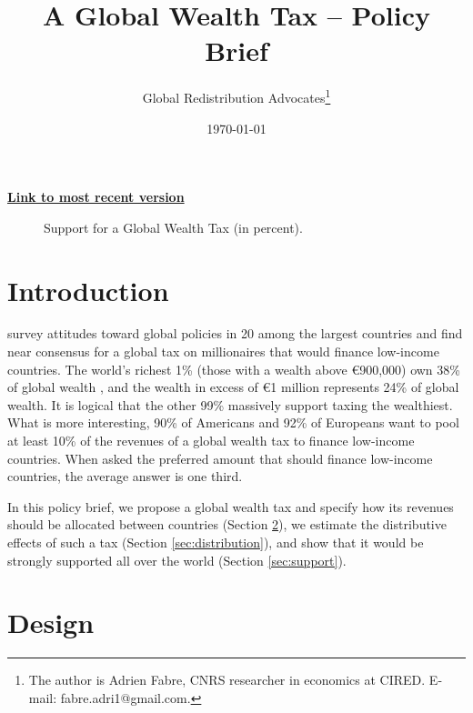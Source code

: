 \documentclass[12pt,english]{article}
\title{A Global Wealth Tax -- Policy Brief
}
\author{Global Redistribution Advocates\footnote{The author is Adrien Fabre, CNRS researcher in economics at CIRED. E-mail: fabre.adri1@gmail.com.}}
\date{\today}
\begin{document}
\maketitle

\begin{center}
{\textbf{\href{https://github.com/bixiou/global_tax_attitudes/raw/main/paper/policy_brief_tax.pdf}{Link to most recent version}}}
\end{center}

\begin{figure}[h!]
  \caption{Support for a Global Wealth Tax (in percent).}\label{fig:support}
\end{figure}

\section{Introduction}\label{sec:intro}

\citet{fabre_international_2023} survey attitudes toward global policies in 20 among the largest countries and find near consensus for a global tax on millionaires that would finance low-income countries. The world's richest 1\% (those with a wealth above \euro{}900,000) own 38\% of global wealth \citep{chancel_world_2022}, and the wealth in excess of \euro{}1 million represents 24\% of global wealth. It is logical that the other 99\% massively support taxing the wealthiest. What is more interesting, 90\% of Americans and 92\% of Europeans want to pool at least 10\% of the revenues of a global wealth tax to finance low-income countries. When asked the preferred amount that should finance low-income countries, the average answer is one third.

In this policy brief, we propose a global wealth tax and specify how its revenues should be allocated between countries (Section \ref{sec:design}), we estimate the distributive effects of such a tax (Section \ref{sec:distribution}), and show that it would be strongly supported all over the world (Section \ref{sec:support}).

\section{Design}\label{sec:design}
\end{document}
